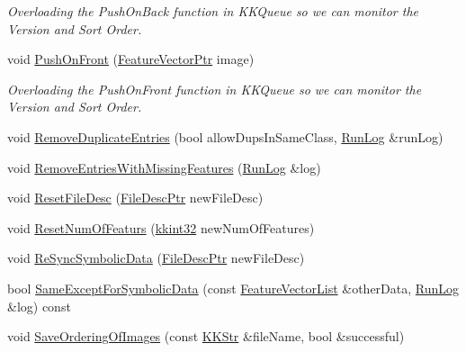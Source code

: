\begin{DoxyCompactItemize}
\begin{DoxyCompactList}\small\item\em Overloading the Push\+On\+Back function in K\+K\+Queue so we can monitor the Version and Sort Order. \end{DoxyCompactList}\item 
void \hyperlink{class_k_k_m_l_l_1_1_feature_vector_list_aa08f379ceb43277e64a72b72746898a6}{Push\+On\+Front} (\hyperlink{namespace_k_k_m_l_l_a0c5df3d48f45926fbc4fee04f5e3bc04}{Feature\+Vector\+Ptr} image)
\begin{DoxyCompactList}\small\item\em Overloading the Push\+On\+Front function in K\+K\+Queue so we can monitor the Version and Sort Order. \end{DoxyCompactList}\item 
void \hyperlink{class_k_k_m_l_l_1_1_feature_vector_list_a3e46e751eb629b62b03c3d400f61205f}{Remove\+Duplicate\+Entries} (bool allow\+Dups\+In\+Same\+Class, \hyperlink{class_k_k_b_1_1_run_log}{Run\+Log} \&run\+Log)
\item 
void \hyperlink{class_k_k_m_l_l_1_1_feature_vector_list_ac725347fde2be6ec6c042b421aacb592}{Remove\+Entries\+With\+Missing\+Features} (\hyperlink{class_k_k_b_1_1_run_log}{Run\+Log} \&log)
\item 
void \hyperlink{class_k_k_m_l_l_1_1_feature_vector_list_a60576f54b108d40bc6ad032b1b773467}{Reset\+File\+Desc} (\hyperlink{namespace_k_k_m_l_l_aa0d0b6ab4ec18868a399b8455b05d914}{File\+Desc\+Ptr} new\+File\+Desc)
\item 
void \hyperlink{class_k_k_m_l_l_1_1_feature_vector_list_a49bffdbe1cf2f308a8a3abb4a5e25602}{Reset\+Num\+Of\+Featurs} (\hyperlink{namespace_k_k_b_a8fa4952cc84fda1de4bec1fbdd8d5b1b}{kkint32} new\+Num\+Of\+Features)
\item 
void \hyperlink{class_k_k_m_l_l_1_1_feature_vector_list_ae7e1f851736f8e8c8dda50b33ea43c3c}{Re\+Sync\+Symbolic\+Data} (\hyperlink{namespace_k_k_m_l_l_aa0d0b6ab4ec18868a399b8455b05d914}{File\+Desc\+Ptr} new\+File\+Desc)
\item 
bool \hyperlink{class_k_k_m_l_l_1_1_feature_vector_list_ab4d86818c89350048f1c5aa182db70e1}{Same\+Except\+For\+Symbolic\+Data} (const \hyperlink{class_k_k_m_l_l_1_1_feature_vector_list}{Feature\+Vector\+List} \&other\+Data, \hyperlink{class_k_k_b_1_1_run_log}{Run\+Log} \&log) const 
\item 
void \hyperlink{class_k_k_m_l_l_1_1_feature_vector_list_adba9c33aa5d4a7062e74ef9dcd893924}{Save\+Ordering\+Of\+Images} (const \hyperlink{class_k_k_b_1_1_k_k_str}{K\+K\+Str} \&file\+Name, bool \&successful)

\end{DoxyCompactItemize}
